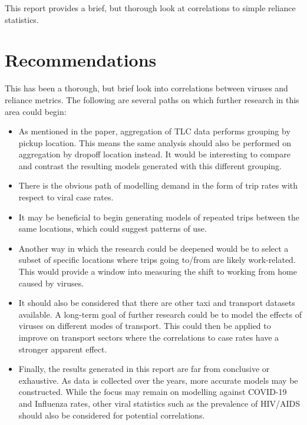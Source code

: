\documentclass[11pt]{article}
\begin{document}
This report provides a brief, but thorough look at correlations to simple reliance statistics.


\section{Recommendations}
This has been a thorough, but brief look into correlations between viruses and reliance metrics.
The following are several paths on which further research in this area could begin:
\begin{itemize}
    \item As mentioned in the paper, aggregation of TLC data performs grouping by pickup location.
    This means the same analysis should also be performed on aggregation by dropoff location instead.
    It would be interesting to compare and contrast the resulting models generated with this different grouping.
    \item There is the obvious path of modelling demand in the form of trip rates with respect to viral case rates. 
    \item It may be beneficial to begin generating models of repeated trips between the same locations,
    which could suggest patterns of use.
    \item Another way in which the research could be deepened would be to select a subset of specific locations where trips going to/from are likely work-related. 
    This would provide a window into measuring the shift to working from home caused by viruses.
    \item It should also be considered that there are other taxi and transport datasets available.
    A long-term goal of further research could be to model the effects of viruses on different modes of transport.
    This could then be applied to improve on transport sectors where the correlations to case rates have a stronger apparent effect.
    \item Finally, the results generated in this report are far from conclusive or exhaustive.
    As data is collected over the years, more accurate models may be constructed. 
    While the focus may remain on modelling against COVID-19 and Influenza rates, 
    other viral statistics such as the prevalence of HIV/AIDS should also be considered for potential correlations.
\end{itemize}

\clearpage

\printbibliography
\end{document}
